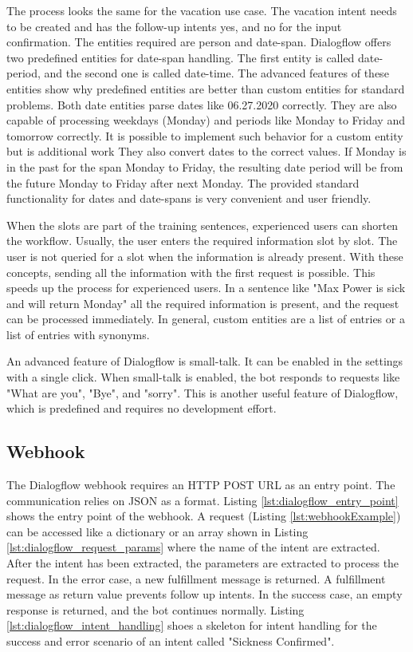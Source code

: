 The process looks the same for the vacation use case.
The vacation intent needs to be created and has the follow-up intents 
yes, and no for the input confirmation.
The entities required are person and date-span.
Dialogflow offers two predefined entities for date-span handling.
The first entity is called date-period, and the second one is called date-time.
The advanced features of these entities show why predefined entities are better than custom entities for standard problems.
Both date entities parse dates like 06.27.2020 correctly.
They are also capable of processing weekdays (Monday) and periods like Monday to Friday and tomorrow correctly.
It is possible to implement such behavior for a custom entity but is additional work
They also convert dates to the correct values.
If Monday is in the past for the span Monday to Friday, the resulting date period will be from the future Monday to Friday after next Monday.
The provided standard functionality for dates and date-spans is very convenient and user friendly.

When the slots are part of the training sentences, experienced users can shorten the workflow.
Usually, the user enters the required information slot by slot.
The user is not queried for a slot when the information is already present.
With these concepts, sending all the information with the first request is possible.
This speeds up the process for experienced users.
In a sentence like "Max Power is sick and will return Monday" all the required information is present, and the request can be processed immediately.
In general, custom entities are a list of entries or a list of entries with synonyms.

An advanced feature of Dialogflow is small-talk.
It can be enabled in the settings with a single click.
When small-talk is enabled, the bot responds to requests like "What are you", "Bye", and "sorry".
This is another useful feature of Dialogflow, which is predefined and requires no development effort. 

\subsection{Webhook}
The Dialogflow webhook requires an HTTP POST URL as an entry point.
The communication relies on JSON as a format.
Listing \ref{lst:dialogflow_entry_point} shows the entry point of the webhook.
A request (Listing \ref{lst:webhookExample}) can be accessed like a dictionary or an array shown in Listing \ref{lst:dialogflow_request_params} where the name of the intent are extracted. 
After the intent has been extracted, the parameters are extracted to process the request.
In the error case, a new fulfillment message is returned.
A fulfillment message as return value prevents follow up intents.
In the success case, an empty response is returned, and the bot continues normally.
Listing \ref{lst:dialogflow_intent_handling} shoes a skeleton for intent handling for the success and error scenario of an intent called "Sickness Confirmed".

